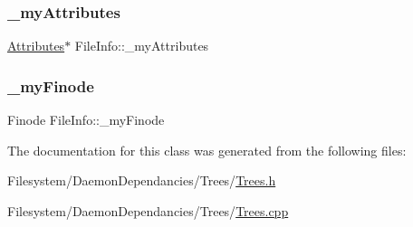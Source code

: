 \subsubsection{\texorpdfstring{\+\_\+my\+Attributes}{\_myAttributes}}
{\footnotesize\ttfamily \mbox{\hyperlink{class_attributes}{Attributes}}$\ast$ File\+Info\+::\+\_\+my\+Attributes\hspace{0.3cm}{\ttfamily [private]}}

\mbox{\label{class_file_info_aa9f9a75407d29778170a902e070d47ad}} 
\subsubsection{\texorpdfstring{\+\_\+my\+Finode}{\_myFinode}}
{\footnotesize\ttfamily Finode File\+Info\+::\+\_\+my\+Finode\hspace{0.3cm}{\ttfamily [private]}}



The documentation for this class was generated from the following files\+:\begin{DoxyCompactItemize}
\item 
Filesystem/\+Daemon\+Dependancies/\+Trees/\mbox{\hyperlink{_trees_8h}{Trees.\+h}}\item 
Filesystem/\+Daemon\+Dependancies/\+Trees/\mbox{\hyperlink{_trees_8cpp}{Trees.\+cpp}}\end{DoxyCompactItemize}
